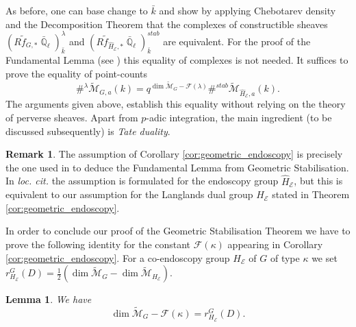\documentclass{article}
\newcommand{\Mc}{\mathcal{M}}
\DeclareMathOperator{\Qb}{\mathbb{Q}}
\newcommand{\CE}{{\mathcal E}}
\newcommand{\CF}{{\mathcal F}}
\newcommand{\wmc}{\widetilde{\Mc} }
\theoremstyle{definition}
\newtheorem{rmk}[definition]{Remark}
\theoremstyle{plain}
\newtheorem{lemma}[definition]{Lemma}
\begin{document}
As before, one can base change to $\bar{k}$ and show by applying Chebotarev density and the Decomposition Theorem that 
the complexes of constructible sheaves $(R\widetilde{f}_{G,*}\bar{\Qb}_{\ell})^{\lambda}_{\bar k}$ and $(R\widetilde{f}_{\widehat{H}_{\CE},*}\bar{\Qb}_{\ell})^{stab}_{\bar k}$ are equivalent. For the proof of the Fundamental Lemma (see \cite[Section 8]{MR2653248}) this equality of complexes is not needed. It suffices to prove the equality of point-counts
$$\#^{\lambda} \wmc_{G,a}(k) =q^{\dim \wmc_G -\CF(\lambda)}\#^{stab} \wmc_{\widehat{H}_\CE,a}(k).$$
The arguments given above, establish this equality without relying on the theory of perverse sheaves. Apart from $p$-adic integration, the main ingredient (to be discussed subsequently) is \emph{Tate duality}.

\begin{rmk}
The assumption of Corollary \ref{cor:geometric_endoscopy} is precisely the one used in \cite[8.6.3]{MR2653248} to deduce the Fundamental Lemma from Geometric Stabilisation. In \emph{loc. cit.} the assumption is formulated for the endoscopy group $\widehat{H}_{\CE}$, but this is equivalent to our assumption for the Langlands dual group $H_{\CE}$ stated in Theorem \ref{cor:geometric_endoscopy}.
\end{rmk}

In order to conclude our proof of the Geometric Stabilisation Theorem we have to prove the following identity for the constant $\mathcal{F}(\kappa)$ appearing in Corollary \ref{cor:geometric_endoscopy}. For a co-endoscopy group $H_{\CE}$ of  $G$ of type $\kappa$ %
we set $r^G_{H_{\CE}}(D)=\frac{1}{2}(\dim \widetilde{\Mc}_{G} - \dim \widetilde{\Mc}_{H_{\CE}} )$.

\begin{lemma} We have 
\[  \dim \wmc_G - \mathcal{F}(\kappa)= r^G_{H_{\CE}}(D). \]
\end{lemma}
\end{document}

